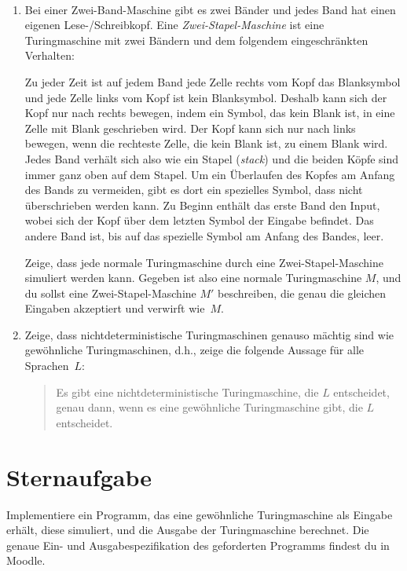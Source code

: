\documentclass{uebung_cs}
\begin{document}
\begin{aufgabe}[Turingmaschinen V]\
	\begin{enumerate}
		\item Bei einer Zwei-Band-Maschine gibt es zwei Bänder und jedes Band hat einen eigenen Lese-/Schreibkopf.
		Eine \emph{Zwei-Stapel-Maschine} ist eine Turingmaschine mit zwei Bändern und dem folgendem eingeschränkten Verhalten:
		
		Zu jeder Zeit ist auf jedem Band jede Zelle rechts vom Kopf das Blanksymbol und jede Zelle links vom Kopf ist kein Blanksymbol. Deshalb kann sich der Kopf nur nach rechts bewegen, indem ein Symbol, das kein Blank ist, in eine Zelle mit Blank geschrieben wird. Der Kopf kann sich nur nach links bewegen, wenn die rechteste Zelle, die kein Blank ist, zu einem Blank wird. Jedes Band verhält sich also wie ein Stapel (\emph{stack}) und die beiden Köpfe sind immer ganz oben auf dem Stapel. Um ein Überlaufen des Kopfes am Anfang des Bands zu vermeiden, gibt es dort ein spezielles Symbol, dass nicht überschrieben werden kann. Zu Beginn enthält das erste Band den Input, wobei sich der Kopf über dem letzten Symbol der Eingabe befindet. Das andere Band ist, bis auf das spezielle Symbol am Anfang des Bandes, leer.
		
		Zeige, dass jede normale Turingmaschine durch eine Zwei-Stapel-Maschine simuliert werden kann. Gegeben ist also eine normale Turingmaschine $M$, und du sollst eine Zwei-Stapel-Maschine $M'$ beschreiben, die genau die gleichen Eingaben akzeptiert und verwirft wie~$M$.
		
		\item Zeige, dass nichtdeterministische Turingmaschinen genauso mächtig sind wie gewöhnliche Turingmaschinen, d.h., zeige die folgende Aussage für alle Sprachen~$L$:
		\begin{quote}
			Es gibt eine nichtdeterministische Turingmaschine, die $L$ entscheidet, genau dann, wenn es eine gewöhnliche Turingmaschine gibt, die $L$ entscheidet.
		\end{quote}
	\end{enumerate}
\end{aufgabe}


\section*{Sternaufgabe}

\begin{aufgabe}[\emoji{star}: Turingmaschine simulieren (Coderunner)]
  Implementiere ein Programm, das eine gewöhnliche Turingmaschine als Eingabe erhält, diese simuliert, und die Ausgabe der Turingmaschine berechnet. Die genaue Ein- und Ausgabespezifikation des geforderten Programms findest du in Moodle.
\end{aufgabe}
\end{document}
